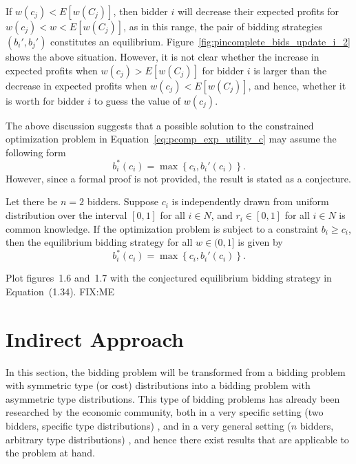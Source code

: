 If $w(c_j) < E[w(C_j)]$, then bidder $i$ will decrease their expected profits for $w(c_j) < w < E[w(C_j)]$, as in this range, the pair of bidding strategies $(b_i',b_j')$ constitutes an equilibrium. Figure~\ref{fig:pincomplete_bids_update_i_2} shows the above situation. However, it is not clear whether the increase in expected profits when $w(c_j) > E[w(C_j)]$ for bidder $i$ is larger than the decrease in expected profits when $w(c_j) < E[w(C_j)]$, and hence, whether it is worth for bidder $i$ to guess the value of $w(c_j)$.

The above discussion suggests that a possible solution to the constrained optimization problem in Equation~\eqref{eq:pcomp_exp_utility_c} may assume the following form
\begin{equation*}
	b_i^*(c_i) = \max\left\{ c_i, b_i'(c_i) \right\}.
\end{equation*}
However, since a formal proof is not provided, the result is stated as a conjecture.
\begin{conjecture}
\label{conj:pcomp_max_equi_bidding_str}
Let there be $n=2$ bidders. Suppose $c_i$ is independently drawn from uniform distribution over the interval $[0,1]$ for all $i\in N$, and $r_i\in [0,1]$ for all $i\in N$ is common knowledge. If the optimization problem is subject to a constraint $b_i\ge c_i$, then the equilibrium bidding strategy for all $w\in (0,1]$ is given by
\begin{equation}
\label{eq:pcomp_equi_bidding_str_max}
	b_i^*(c_i) = \max\left\{ c_i, b_i'(c_i) \right\}.
\end{equation}
\end{conjecture}
Plot figures~1.6 and~1.7 with the conjectured equilibrium bidding strategy in Equation~(1.34). FIX:ME

\section{Indirect Approach} %
\label{sec:indirect_approach}
In this section, the bidding problem will be transformed from a bidding problem with symmetric type (or cost) distributions into a bidding problem with asymmetric type distributions. This type of bidding problems has already been researched by the economic community, both in a very specific setting (two bidders, specific type distributions) \cite{KaplanZamir2007,MaskinRiley2000}, and in a very general setting ($n$ bidders, arbitrary type distributions) \cite{Lebrun1999,Lebrun2006}, and hence there exist results that are applicable to the problem at hand.

